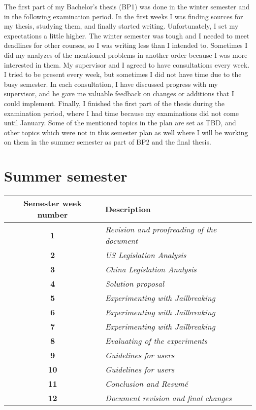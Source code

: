 The first part of my Bachelor's thesis (BP1) was done in the winter semester and in the following examination period. In the first weeks I was finding sources for my thesis, studying them, and finally started writing. Unfortunately, I set my expectations a little higher. The winter semester was tough and I needed to meet deadlines for other courses, so I was writing less than I intended to. Sometimes I did my analyzes of the mentioned problems in another order because I was more interested in them. My supervisor and I agreed to have consultations every week. I tried to be present every week, but sometimes I did not have time due to the busy semester. In each consultation, I have discussed progress with my supervisor, and he gave me valuable feedback on changes or additions that I could implement. Finally, I finished the first part of the thesis during the examination period, where I had time because my examinations did not come until January. Some of the mentioned topics in the plan are set as TBD, and other topics which were not in this semester plan as well where I will be working on them in the summer semester as part of BP2 and the final thesis.


\newpage


\section*{Summer semester}

\begin{table}[htpb]
    \centering
    \begin{tabular}{|c|l|}
    \hline
    \cellcolor[gray]{0.8}\textbf{Semester week number} & \cellcolor[gray]{0.8}\textbf{Description} \\ \hline

    \textbf{1} & \textit{Revision and proofreading of the document} \\ \hline
    \textbf{2} & \textit{US Legislation Analysis} \\ \hline
    \textbf{3} & \textit{China Legislation Analysis} \\ \hline
    \textbf{4} & \textit{Solution proposal} \\ \hline
    \textbf{5} & \textit{Experimenting with Jailbreaking} \\ \hline
    \textbf{6} & \textit{Experimenting with Jailbreaking} \\ \hline
    \textbf{7} & \textit{Experimenting with Jailbreaking} \\ \hline
    \textbf{8} & \textit{Evaluating of the experiments} \\ \hline
    \textbf{9} & \textit{Guidelines for users} \\ \hline
    \textbf{10} & \textit{Guidelines for users} \\ \hline
    \textbf{11} & \textit{Conclusion and Resumé} \\ \hline
    \textbf{12} & \textit{Document revision and final changes} \\ \hline
    \end{tabular}
\end{table}

